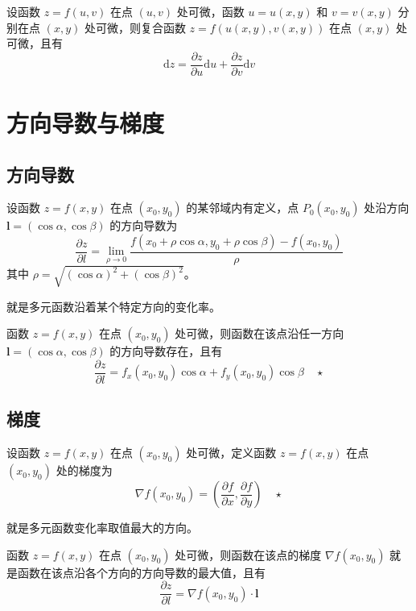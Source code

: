 \begin{theorem}
    设函数 $z=f(u,v)$ 在点 $(u,v)$ 处可微，函数 $u=u(x,y)$ 和 $v=v(x,y)$ 分别在点 $(x,y)$ 处可微，则复合函数 $z=f(u(x,y),v(x,y))$ 在点 $(x,y)$ 处可微，且有
    \[
        \mathrm{d}z=\frac{\partial z}{\partial u}\mathrm{d}u+\frac{\partial z}{\partial v}\mathrm{d}v
    \]
\end{theorem}

\section{方向导数与梯度}

\subsection{方向导数}

\begin{definition}
    设函数 $z=f(x,y)$ 在点 $(x_0,y_0)$ 的某邻域内有定义，点 $P_0(x_0,y_0)$ 处沿方向 $\bm{l}=(\cos\alpha,\cos\beta)$ 的方向导数为
    \[
        \frac{\partial z}{\partial l}=\lim_{\rho\to 0}\frac{f(x_0+\rho\cos\alpha,y_0+\rho\cos\beta)-f(x_0,y_0)}{\rho}
    \]
    其中 $\rho=\sqrt{(\cos\alpha)^2+(\cos\beta)^2}$。
\end{definition}

就是多元函数沿着某个特定方向的变化率。

\begin{theorem}
    函数 $z=f(x,y)$ 在点 $(x_0,y_0)$ 处可微，则函数在该点沿任一方向 $\bm{l}=(\cos\alpha,\cos\beta)$ 的方向导数存在，且有
    \[
        \frac{\partial z}{\partial l}=f_x(x_0,y_0)\cos\alpha+f_y(x_0,y_0)\cos\beta\quad\star
    \]
\end{theorem}

\subsection{梯度}

\begin{definition}
    设函数 $z=f(x,y)$ 在点 $(x_0,y_0)$ 处可微，定义函数 $z=f(x,y)$ 在点 $(x_0,y_0)$ 处的梯度为
    \[
        \nabla f(x_0,y_0)=\left(\frac{\partial f}{\partial x},\frac{\partial f}{\partial y}\right)\quad\star
    \]
\end{definition}

就是多元函数变化率取值最大的方向。

\begin{theorem}
    函数 $z=f(x,y)$ 在点 $(x_0,y_0)$ 处可微，则函数在该点的梯度 $\nabla f(x_0,y_0)$ 就是函数在该点沿各个方向的方向导数的最大值，且有
    \[
        \frac{\partial z}{\partial l}=\nabla f(x_0,y_0)\cdot\bm{l}
    \]
\end{theorem}

